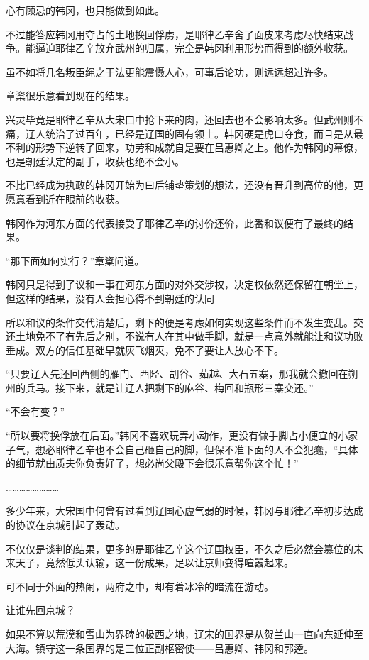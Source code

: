 心有顾忌的韩冈，也只能做到如此。

不过能答应韩冈用夺占的土地换回俘虏，是耶律乙辛舍了面皮来考虑尽快结束战争。能逼迫耶律乙辛放弃武州的归属，完全是韩冈利用形势而得到的额外收获。

虽不如将几名叛臣绳之于法更能震慑人心，可事后论功，则远远超过许多。

章楶很乐意看到现在的结果。

兴灵毕竟是耶律乙辛从大宋口中抢下来的肉，还回去也不会影响太多。但武州则不痛，辽人统治了过百年，已经是辽国的固有领土。韩冈硬是虎口夺食，而且是从最不利的形势下逆转了回来，功劳和成就自是要在吕惠卿之上。他作为韩冈的幕僚，也是朝廷认定的副手，收获也绝不会小。

不比已经成为执政的韩冈开始为曰后铺垫策划的想法，还没有晋升到高位的他，更愿意看到近在眼前的收获。

韩冈作为河东方面的代表接受了耶律乙辛的讨价还价，此番和议便有了最终的结果。

“那下面如何实行？”章楶问道。

韩冈只是得到了议和一事在河东方面的对外交涉权，决定权依然还保留在朝堂上，但这样的结果，没有人会担心得不到朝廷的认同

所以和议的条件交代清楚后，剩下的便是考虑如何实现这些条件而不发生变乱。交还土地免不了有先后之别，不说有人在其中做手脚，就是一点意外就能让和议功败垂成。双方的信任基础早就灰飞烟灭，免不了要让人放心不下。

“只要辽人先还回西侧的雁门、西陉、胡谷、茹越、大石五寨，那我就会撤回在朔州的兵马。接下来，就是让辽人把剩下的麻谷、梅回和瓶形三寨交还。”

“不会有变？”

“所以要将换俘放在后面。”韩冈不喜欢玩弄小动作，更没有做手脚占小便宜的小家子气，想必耶律乙辛也不会自己砸自己的脚，但保不准下面的人不会犯蠢，“具体的细节就由质夫你负责好了，想必尚父殿下会很乐意帮你这个忙！”

……………………

多少年来，大宋国中何曾有过看到辽国心虚气弱的时候，韩冈与耶律乙辛初步达成的协议在京城引起了轰动。

不仅仅是谈判的结果，更多的是耶律乙辛这个辽国权臣，不久之后必然会篡位的未来天子，竟然低头认输，这一份成果，足以让京师变得喧嚣起来。

可不同于外面的热闹，两府之中，却有着冰冷的暗流在游动。

让谁先回京城？

如果不算以荒漠和雪山为界碑的极西之地，辽宋的国界是从贺兰山一直向东延伸至大海。镇守这一条国界的是三位正副枢密使——吕惠卿、韩冈和郭逵。

